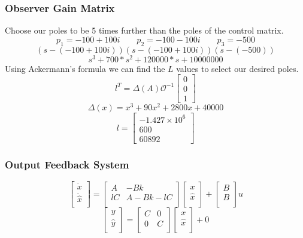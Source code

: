 \documentclass{beamer}
\begin{document}
\begin{frame}
\frametitle{Observer Gain Matrix}
Choose our poles to be 5 times further than the poles of the control matrix.
$$p_1 = -100+100i \qquad p_2 = -100-100i \qquad p_3 = -500 $$
$$ (s-(-100+100i))(s-(-100+100i))(s-(-500)) $$
$$ s^3 + 700*s^2 + 120000*s + 10000000 $$
Using Ackermann's formula we can find the $L$ values to select our desired poles.
$$ l^T = \Delta(A) \mathcal{O}^{-1} \begin{bmatrix}0 \\ 0 \\ 1 \end{bmatrix} $$
$$ \Delta(x) = x^3 + 90x^2 +2800x + 40000 $$
$$ l = \begin{bmatrix} -1.427 \times 10^6 \\ 600 \\ 60892 \end{bmatrix} $$
\end{frame}

\begin{frame}
\frametitle{Output Feedback System}
$$
\begin{bmatrix}
\dot{x} \\
\dot{\hat{x}} \\
\end{bmatrix}
=
\begin{bmatrix}
A & -Bk \\
lC & A-Bk-lC \\
\end{bmatrix}
\begin{bmatrix}
x \\
\hat{x} \\
\end{bmatrix}
+
\begin{bmatrix}
B \\
B \\
\end{bmatrix}
u
$$
$$
\begin{bmatrix}
y \\
\hat{y} \\
\end{bmatrix}
=
\begin{bmatrix}
C & 0 \\
0 & C \\
\end{bmatrix}
\begin{bmatrix}
x \\
\hat{x} \\
\end{bmatrix}
+
0
$$
\end{frame}
\end{document}
